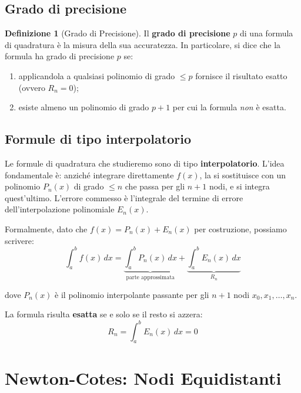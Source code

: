 \documentclass[a4paper,12pt]{article}
\theoremstyle{definition}
\newtheorem{definizione}{Definizione}[section]
\theoremstyle{remark}
\begin{document}
\subsection{Grado di precisione}

\begin{definizione}[Grado di Precisione]
Il \textbf{grado di precisione} $p$ di una formula di quadratura è la
misura della sua accuratezza. In particolare, si dice che la formula ha
grado di precisione $p$ se:
\begin{enumerate}
  \item applicandola a qualsiasi polinomio di grado $\le p$ fornisce il
        risultato esatto (ovvero $R_n = 0$);
  \item esiste almeno un polinomio di grado $p+1$ per cui la formula
        \emph{non} è esatta.
\end{enumerate}
\end{definizione}

\subsection{Formule di tipo interpolatorio}

Le formule di quadratura che studieremo sono di tipo \textbf{interpolatorio}.
L'idea fondamentale è: anziché integrare direttamente $f(x)$,
la si sostituisce con un polinomio $P_n(x)$ di grado $\le n$ che passa
per gli $n+1$ nodi, e si integra quest'ultimo.
L'errore commesso è l'integrale del termine di errore dell'interpolazione
polinomiale $E_n(x)$.

Formalmente, dato che $f(x) = P_n(x) + E_n(x)$ per costruzione, possiamo
scrivere:
\begin{equation}
  \int_a^b f(x)\,dx
  = \underbrace{\int_a^b P_n(x)\,dx}_{\text{parte approssimata}}
  + \underbrace{\int_a^b E_n(x)\,dx}_{R_n}
  \label{eq:decomposizione}
\end{equation}

\noindent dove $P_n(x)$ è il polinomio interpolante passante per gli
$n+1$ nodi $x_0, x_1, \ldots, x_n$.

La formula risulta \textbf{esatta} se e solo se il resto si azzera:
\[
  R_n = \int_a^b E_n(x)\,dx = 0
\]

\section{Newton-Cotes: Nodi Equidistanti}
\end{document}
